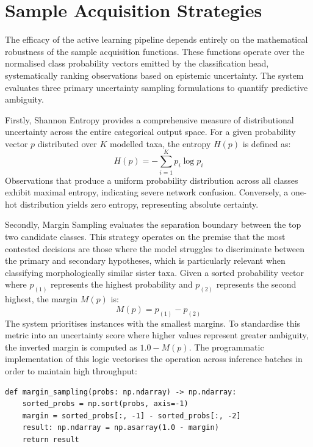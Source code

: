 \section{Sample Acquisition Strategies}
\label{sec:acquisition_strategies}

The efficacy of the active learning pipeline depends entirely on the mathematical robustness of the sample acquisition functions. These functions operate over the normalised class probability vectors emitted by the classification head, systematically ranking observations based on epistemic uncertainty. The system evaluates three primary uncertainty sampling formulations to quantify predictive ambiguity.

Firstly, Shannon Entropy provides a comprehensive measure of distributional uncertainty across the entire categorical output space. For a given probability vector $p$ distributed over $K$ modelled taxa, the entropy $H(p)$ is defined as:
\[
H(p) = -\sum_{i=1}^K p_i \log p_i
\]
Observations that produce a uniform probability distribution across all classes exhibit maximal entropy, indicating severe network confusion. Conversely, a one-hot distribution yields zero entropy, representing absolute certainty.

Secondly, Margin Sampling evaluates the separation boundary between the top two candidate classes. This strategy operates on the premise that the most contested decisions are those where the model struggles to discriminate between the primary and secondary hypotheses, which is particularly relevant when classifying morphologically similar sister taxa. Given a sorted probability vector where $p_{(1)}$ represents the highest probability and $p_{(2)}$ represents the second highest, the margin $M(p)$ is:
\[
M(p) = p_{(1)} - p_{(2)}
\]
The system prioritises instances with the smallest margins. To standardise this metric into an uncertainty score where higher values represent greater ambiguity, the inverted margin is computed as $1.0 - M(p)$. The programmatic implementation of this logic vectorises the operation across inference batches in order to maintain high throughput:

\begin{listing}[htbp]
\begin{verbatim}
def margin_sampling(probs: np.ndarray) -> np.ndarray:
    sorted_probs = np.sort(probs, axis=-1)
    margin = sorted_probs[:, -1] - sorted_probs[:, -2]
    result: np.ndarray = np.asarray(1.0 - margin)
    return result
\end{verbatim}
\caption{Vectorised multi-class margin sampling implementation.}
\label{lst:margin_sampling}
\end{listing}

